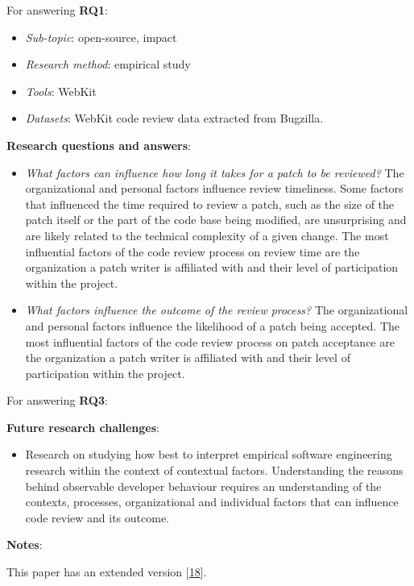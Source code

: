 \documentclass[]{book}
\providecommand{\tightlist}{%
  \setlength{\itemsep}{0pt}\setlength{\parskip}{0pt}}
\begin{document}
For answering \textbf{RQ1}:

\begin{itemize}
\tightlist
\item
  \emph{Sub-topic}: open-source, impact
\item
  \emph{Research method}: empirical study
\item
  \emph{Tools}: WebKit
\item
  \emph{Datasets}: WebKit code review data extracted from Bugzilla.
\end{itemize}

\textbf{Research questions and answers}:

\begin{itemize}
\item
  \emph{What factors can influence how long it takes for a patch to be
  reviewed?} The organizational and personal factors influence review
  timeliness. Some factors that influenced the time required to review a
  patch, such as the size of the patch itself or the part of the code
  base being modified, are unsurprising and are likely related to the
  technical complexity of a given change. The most influential factors
  of the code review process on review time are the organization a patch
  writer is affiliated with and their level of participation within the
  project.
\item
  \emph{What factors influence the outcome of the review process?} The
  organizational and personal factors influence the likelihood of a
  patch being accepted. The most influential factors of the code review
  process on patch acceptance are the organization a patch writer is
  affiliated with and their level of participation within the project.
\end{itemize}

For answering \textbf{RQ3}:

\textbf{Future research challenges}:

\begin{itemize}
\tightlist
\item
  Research on studying how best to interpret empirical software
  engineering research within the context of contextual factors.
  Understanding the reasons behind observable developer behaviour
  requires an understanding of the contexts, processes, organizational
  and individual factors that can influence code review and its outcome.
\end{itemize}

\textbf{Notes}:

This paper has an extended version
{[}\protect\hyperlink{ref-baysal2016investigating}{18}{]}.
\end{document}
